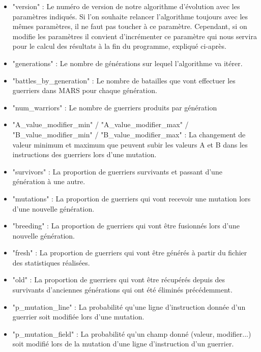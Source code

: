 \documentclass[french]{article}
\begin{document}
\begin{enumerate}
                    \bigskip
                    \begin{itemize}
                        \item "version" : Le numéro de version de notre algorithme d'évolution avec les paramètres indiqués. Si l'on souhaite relancer l'algorithme toujours avec les mêmes paramètres, il ne faut pas toucher à ce paramètre. Cependant, si on modifie les paramètres il convient d'incrémenter ce paramètre qui nous servira pour le calcul des résultats à la fin du programme, expliqué ci-après.
                        \item "generations" : Le nombre de générations sur lequel l'algorithme va itérer.
                	    \item "battles\_by\_generation" : Le nombre de batailles que vont effectuer les guerriers dans MARS pour chaque génération.
                    	\item "num\_warriors" : Le nombre de guerriers produits par génération
                    	\item "A\_value\_modifier\_min" / "A\_value\_modifier\_max" / "B\_value\_modifier\_min" / \newline"B\_value\_modifier\_max" : La changement de valeur minimum et maximum que peuvent subir les valeurs A et B dans les instructions des guerriers lors d'une mutation.
                    	\item "survivors" : La proportion de guerriers survivants et passant d'une génération à une autre.
                    	\item "mutations" : La proportion de guerriers qui vont recevoir une mutation lors d'une nouvelle génération.
                    	\item "breeding" : La proportion de guerriers qui vont être fusionnés lors d'une nouvelle génération.
                    	\item "fresh" : La proportion de guerriers qui vont être générés à partir du fichier des statistiques réalisées.
                    	\item "old" : La proportion de guerriers qui vont être récupérés depuis des survivants d'anciennes générations qui ont été éliminés précédemment.
                    	\item "p\_mutation\_line" : La probabilité qu'une ligne d'instruction donnée d'un guerrier soit modifiée lors d'une mutation.
                    	\item "p\_mutation\_field" : La probabilité qu'un champ donné (valeur, modifier...) soit modifié lors de la mutation d'une ligne d'instruction d'un guerrier.

\end{itemize}
\end{enumerate}
\end{document}
